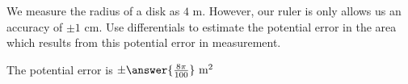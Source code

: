 \documentclass{ximera}
\author{Steven Gubkin}
\begin{document}
\begin{exercise}
  We measure the radius of a disk as $4 \textrm{ m}$.  However, our
  ruler is only allows us an accuracy of $\pm 1 \textrm{ cm}$.  Use
  differentials to estimate the potential error in the area which
  results from this potential error in measurement.

\begin{prompt}
  The potential error is $\pm \answer{\frac{8\pi}{100}} \textrm{ m}^2$
\end{prompt}

\end{exercise}
\end{document}
